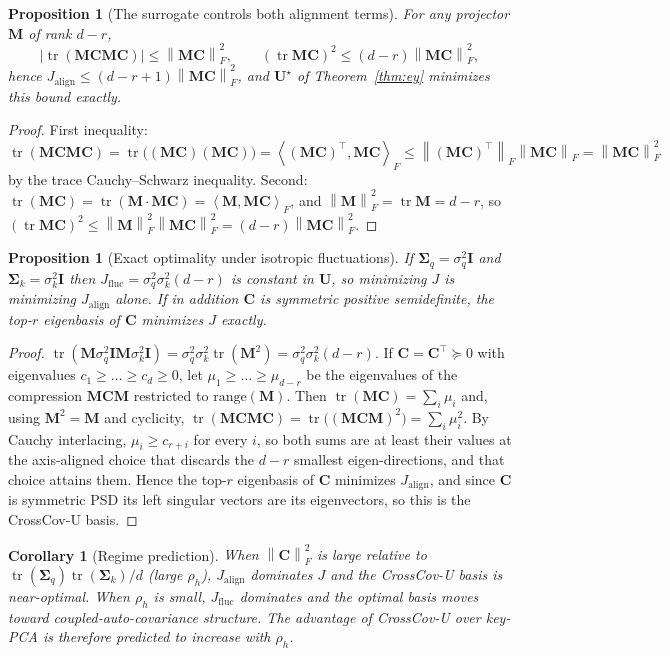 \documentclass[10pt]{article}
\newcommand{\tr}{\operatorname{tr}}
\newcommand{\norm}[1]{\left\lVert #1 \right\rVert}
\newcommand{\fro}[1]{\norm{#1}_F}
\newcommand{\ip}[2]{\left\langle #1, #2 \right\rangle}
\newcommand{\bU}{\mathbf{U}}
\newcommand{\bC}{\mathbf{C}}
\newcommand{\bM}{\mathbf{M}}
\newcommand{\bI}{\mathbf{I}}
\newcommand{\Sq}{\bm{\Sigma}_q}
\newcommand{\Sk}{\bm{\Sigma}_k}
\newcommand{\Jal}{J_{\mathrm{align}}}
\newcommand{\Jfl}{J_{\mathrm{fluc}}}
\newcommand{\method}{CrossCov-U}
\theoremstyle{plain}
\newtheorem{proposition}[theorem]{Proposition}
\newtheorem{corollary}[theorem]{Corollary}
\theoremstyle{definition}
\theoremstyle{remark}
\begin{document}
\begin{proposition}[The surrogate controls both alignment terms]
\label{prop:bound}
For any projector $\bM$ of rank $d-r$,
\begin{equation}
  |\tr(\bM\bC\bM\bC)|\le\fro{\bM\bC}^2,\qquad
  (\tr\bM\bC)^2\le(d-r)\fro{\bM\bC}^2,
\end{equation}
hence $\Jal\le(d-r+1)\fro{\bM\bC}^2$, and $\bU^\star$ of Theorem~\ref{thm:ey}
minimizes this bound exactly.
\end{proposition}
\begin{proof}
First inequality: $\tr(\bM\bC\bM\bC)=\tr\big((\bM\bC)(\bM\bC)\big)
=\ip{(\bM\bC)^\top}{\bM\bC}_F\le\fro{(\bM\bC)^\top}\fro{\bM\bC}=\fro{\bM\bC}^2$
by the trace Cauchy--Schwarz inequality.
Second: $\tr(\bM\bC)=\tr(\bM\cdot\bM\bC)=\ip{\bM}{\bM\bC}_F$, and
$\fro{\bM}^2=\tr\bM=d-r$, so $(\tr\bM\bC)^2\le\fro{\bM}^2\fro{\bM\bC}^2=(d-r)\fro{\bM\bC}^2$.
\end{proof}

\begin{proposition}[Exact optimality under isotropic fluctuations]
\label{prop:iso}
If $\Sq=\sigma_q^2\bI$ and $\Sk=\sigma_k^2\bI$ then
$\Jfl=\sigma_q^2\sigma_k^2(d-r)$ is constant in $\bU$, so minimizing $J$ is
minimizing $\Jal$ alone. If in addition $\bC$ is symmetric positive
semidefinite, the top-$r$ eigenbasis of $\bC$ minimizes $J$ exactly.
\end{proposition}
\begin{proof}
$\tr(\bM\sigma_q^2\bI\bM\sigma_k^2\bI)=\sigma_q^2\sigma_k^2\tr(\bM^2)=\sigma_q^2\sigma_k^2(d-r)$.
If $\bC=\bC^\top\succeq0$ with eigenvalues $c_1\ge\dots\ge c_d\ge0$, let
$\mu_1\ge\dots\ge\mu_{d-r}$ be the eigenvalues of the compression $\bM\bC\bM$
restricted to $\mathrm{range}(\bM)$. Then $\tr(\bM\bC)=\sum_i\mu_i$ and, using
$\bM^2=\bM$ and cyclicity, $\tr(\bM\bC\bM\bC)=\tr\big((\bM\bC\bM)^2\big)=\sum_i\mu_i^2$.
By Cauchy interlacing, $\mu_i\ge c_{r+i}$ for every $i$, so both sums are at
least their values at the axis-aligned choice that discards the $d-r$
smallest eigen-directions, and that choice attains them. Hence the top-$r$
eigenbasis of $\bC$ minimizes $\Jal$, and since $\bC$ is symmetric PSD its
left singular vectors are its eigenvectors, so this is the \method{} basis.
\end{proof}

\begin{corollary}[Regime prediction]
\label{cor:regime}
When $\fro{\bC}^2$ is large relative to $\tr(\Sq)\tr(\Sk)/d$ (large $\rho_h$),
$\Jal$ dominates $J$ and the \method{} basis is near-optimal. When $\rho_h$ is
small, $\Jfl$ dominates and the optimal basis moves toward
coupled-auto-covariance structure. The advantage of \method{} over key-PCA is
therefore predicted to increase with $\rho_h$.
\end{corollary}
\end{document}
